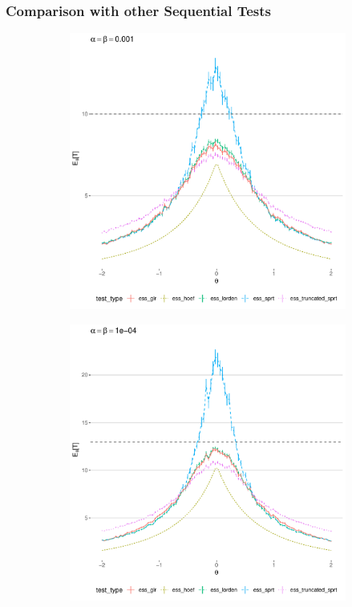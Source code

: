 \documentclass[10pt]{beamer}
\begin{document}
\begin{frame}
\frametitle{Comparison with other Sequential Tests}

\begin{figure}
\centering
\begin{subfigure}{0.49\textwidth}
    \includegraphics[width=\textwidth]{images/ess_alpha1e3}
\end{subfigure}
\hfill
\begin{subfigure}{0.49\textwidth}
    \includegraphics[width=\textwidth]{images/ess_alpha1e4}
\end{subfigure}
\end{figure}
\end{frame}
\end{document}
